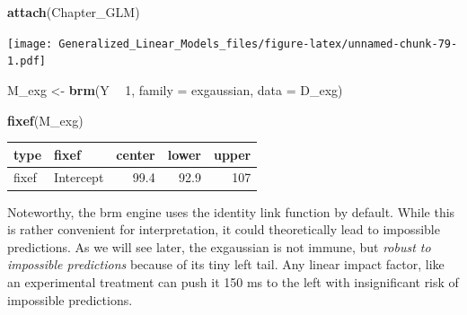 \documentclass[]{svmono}
\newenvironment{Shaded}{\begin{snugshade}}{\end{snugshade}}
\newcommand{\KeywordTok}[1]{\textcolor[rgb]{0.13,0.29,0.53}{\textbf{#1}}}
\newcommand{\DataTypeTok}[1]{\textcolor[rgb]{0.13,0.29,0.53}{#1}}
\newcommand{\DecValTok}[1]{\textcolor[rgb]{0.00,0.00,0.81}{#1}}
\newcommand{\StringTok}[1]{\textcolor[rgb]{0.31,0.60,0.02}{#1}}
\newcommand{\OperatorTok}[1]{\textcolor[rgb]{0.81,0.36,0.00}{\textbf{#1}}}
\newcommand{\NormalTok}[1]{#1}
\theoremstyle{definition}
\theoremstyle{definition}
\theoremstyle{definition}
\theoremstyle{remark}
\begin{document}
\begin{Shaded}
\begin{Highlighting}[]
\KeywordTok{attach}\NormalTok{(Chapter_GLM)}
\end{Highlighting}
\end{Shaded}

\begin{Shaded}
\end{Shaded}

\texttt{[image: Generalized\_Linear\_Models\_files/figure-latex/unnamed-chunk-79-1.pdf]}

\begin{Shaded}
\begin{Highlighting}[]
\NormalTok{M_exg <-}\StringTok{ }\KeywordTok{brm}\NormalTok{(Y }\OperatorTok{~}\StringTok{ }\DecValTok{1}\NormalTok{,}
             \DataTypeTok{family =}\NormalTok{ exgaussian,}
             \DataTypeTok{data =}\NormalTok{ D_exg)}
\end{Highlighting}
\end{Shaded}

\begin{Shaded}
\begin{Highlighting}[]
\KeywordTok{fixef}\NormalTok{(M_exg)}
\end{Highlighting}
\end{Shaded}

\begin{longtable}[]{@{}llrrr@{}}
\toprule
type & fixef & center & lower & upper\tabularnewline
\midrule
\endhead
fixef & Intercept & 99.4 & 92.9 & 107\tabularnewline
\bottomrule
\end{longtable}

Noteworthy, the brm engine uses the identity link function by default.
While this is rather convenient for interpretation, it could
theoretically lead to impossible predictions. As we will see later, the
exgaussian is not immune, but \emph{robust to impossible predictions}
because of its tiny left tail. Any linear impact factor, like an
experimental treatment can push it 150 ms to the left with insignificant
risk of impossible predictions.
\end{document}
